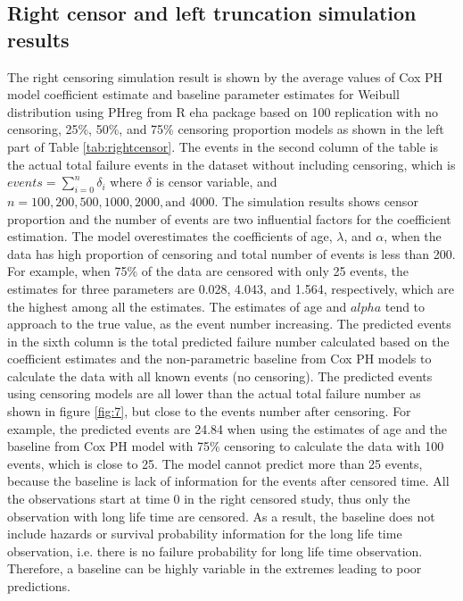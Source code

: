 \documentclass[12pt,letterpaper]{article}
\begin{document}
\subsection{Right censor and left truncation simulation results}
The right censoring simulation result is shown by the average values of Cox PH model coefficient estimate and baseline parameter estimates for Weibull distribution using PHreg from R eha package based on 100 replication with no censoring, 25\%, 50\%, and 75\% censoring proportion models as shown in the left part of Table \ref{tab:rightcensor}. The events in the second column of the table is the actual total failure events in the dataset without including censoring, which is $events=\sum_{i=0}^{n}{\delta_i}$ where $\delta$ is censor variable, and $n=100, 200, 500, 1000, 2000, \text{and } 4000$. The simulation results shows censor proportion and the number of events are two influential factors for the coefficient estimation. The model overestimates the coefficients of age, $\lambda$, and $\alpha$, when the data has high proportion of censoring and total number of events is less than 200. For example, when 75\% of the data are censored with only 25 events, the estimates for three parameters are 0.028, 4.043, and 1.564, respectively, which are the highest among all the estimates. The estimates of age and $alpha$ tend to approach to the true value, as the event number increasing. 
The predicted events in the sixth column is the total predicted failure number calculated based on the coefficient estimates and the non-parametric baseline from Cox PH models to calculate the data with all known events (no censoring). The predicted events using censoring models are all lower than the actual total failure number as shown in figure \ref{fig:7}, but close to the events number after censoring. For example, the predicted events are 24.84 when using the estimates of age and the baseline from Cox PH model with 75\% censoring to calculate the data with 100 events, which is close to 25. The model cannot predict more than 25 events, because the baseline is lack of information for the events after censored time. All the observations start at time 0 in the right censored study, thus only the observation with long life time are censored. As a result, the baseline does not include hazards or survival probability information for the long life time observation, i.e. there is no failure probability for long life time observation. Therefore, a baseline can be highly variable in the extremes leading to poor predictions. 
\end{document}
